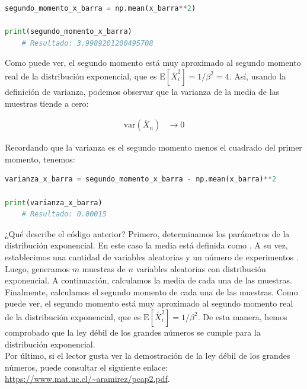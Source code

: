 \documentclass[8pt]{article}
\newcommand{\code}[1]{\texttt{\color{frenchplum}{#1}}}
\begin{document}
\begin{lstlisting}[language=Python]
segundo_momento_x_barra = np.mean(x_barra**2)

print(segundo_momento_x_barra)
    # Resultado: 3.9989201200495708
\end{lstlisting}

Como puede ver, el segundo momento está muy aproximado al segundo momento real de la distribución exponencial, que es $\text{E}[\overline{X}^2_i] = 1/\beta^2 = 4$. Así, usando la definición de varianza, podemos observar que la varianza de la media de las muestras tiende a cero:

\begin{align*}
    \text{var}(\overline{X}_n) &\longrightarrow 0
\end{align*}

Recordando que la varianza es el segundo momento menos el cuadrado del primer momento, tenemos:

\begin{lstlisting}[language=Python]
varianza_x_barra = segundo_momento_x_barra - np.mean(x_barra)**2

print(varianza_x_barra)
    # Resultado: 0.00015
\end{lstlisting}

\vspace*{0.3cm}

¿Qué describe el código anterior? Primero, determinamos los parámetros de la distribución exponencial. En este caso la media está definida como \code{media\_exp = 2}. A su vez, establecimos una cantidad de variables aleatorias \code{n = 10000} y un número de experimentos \code{m = 500}. Luego, generamos $m$ muestras de $n$ variables aleatorias con distribución exponencial. A continuación, calculamos la media de cada una de las muestras. Finalmente, calculamos el segundo momento de cada una de las muestras. Como puede ver, el segundo momento está muy aproximado al segundo momento real de la distribución exponencial, que es $\text{E}[\overline{X}^2_i] = 1/\beta^2$. De esta manera, hemos comprobado que la ley débil de los grandes números se cumple para la distribución exponencial.\\

Por último, si el lector gusta ver la demostración de la ley débil de los grandes números, puede consultar el siguiente enlace: \url{https://www.mat.uc.cl/~aramirez/pcap2.pdf}.


\end{document}
